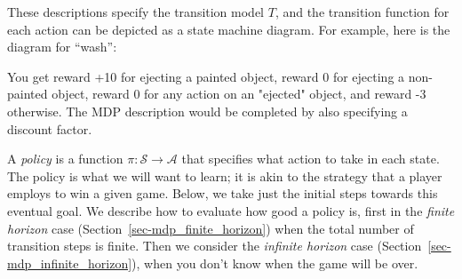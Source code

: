 \begin{examplebox}
  \noindent
  These descriptions specify the transition model $T$, and the
  transition function for each action can be depicted as a state machine
  diagram.  For example, here is the diagram for ``wash'':
  \begin{center}
  \end{center}

  You get reward +10 for ejecting a painted object, reward 0 for
  ejecting a non-painted object, reward 0 for any action on an "ejected"
  object, and reward -3 otherwise.  The MDP description would be
  completed by also specifying a discount factor.

\end{examplebox}



A {\it{policy}} is a function $\pi: \mathcal S \rightarrow \mathcal A$
that specifies what action to take in each state.  The policy is what
we will want to learn; it is akin to the strategy that a player
employs to win a given game.  Below, we take just the initial steps
towards this eventual goal.  We describe how to evaluate how good a
policy is, first in the {\em finite horizon}  case
(Section~\ref{sec-mdp_finite_horizon}) when the total number of
transition steps is finite.  Then we consider the {\em infinite horizon}
case (Section~\ref{sec-mdp_infinite_horizon}), when you
don't know when the game will be over.


